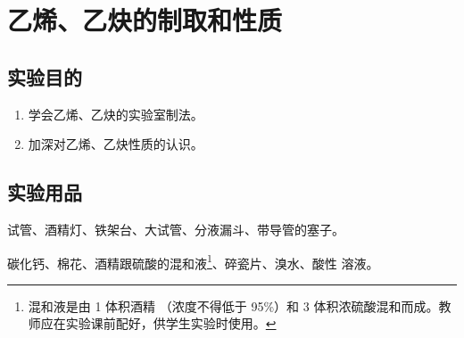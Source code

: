 \section{乙烯、乙炔的制取和性质}
\subsection*{实验目的}
\begin{enumerate}[1.]
  \item 学会乙烯、乙炔的实验室制法。
  \item 加深对乙烯、乙炔性质的认识。
\end{enumerate}
\subsection*{实验用品}
试管、酒精灯、铁架台、大试管、分液漏斗、带导管的塞子。

碳化钙、棉花、酒精跟硫酸的混和液\footnote{混和液是由 1 体积酒精 （浓度不得低于 95\%）和 3 体积浓硫酸混和而成。教师应在实验课前配好，供学生实验时使用。}、碎瓷片、溴水、酸性  溶液。

